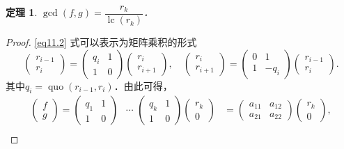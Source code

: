 \documentclass[a4paper,fontset=windows]{ctexbook}
\newtheorem{theorem}{定理}[chapter]
\theoremstyle{definition}
\DeclareMathOperator{\lc}{lc}
\DeclareMathOperator{\quo}{quo}
\begin{document}
\begin{theorem}\label{thm11.6}
$\gcd(f,g)=\dfrac{r_k}{\lc(r_k)}$．
\end{theorem}

\begin{proof}
\eqref{eq11.2} 式可以表示为矩阵乘积的形式
$$\begin{pmatrix}r_{i-1} \\ r_i\end{pmatrix}=\begin{pmatrix}q_i&1 \\ 1&0\end{pmatrix}\begin{pmatrix}r_i \\ r_{i+1}\end{pmatrix},\quad\begin{pmatrix}r_i \\ r_{i+1}\end{pmatrix}=\begin{pmatrix}0&1 \\ 1&-q_i\end{pmatrix}\begin{pmatrix}r_{i-1} \\ r_i\end{pmatrix}.$$
其中$q_i=\quo(r_{i-1},r_i)$．由此可得，
\begin{align}
\begin{pmatrix}f \\ g\end{pmatrix}=\begin{pmatrix}q_1&1 \\ 1&0\end{pmatrix}\hspace{9pt}\cdots\hspace{4pt}\begin{pmatrix}q_k&1 \\ 1&0\end{pmatrix}\begin{pmatrix}r_k \\ 0\end{pmatrix}&=\begin{pmatrix}a_{11}&a_{12} \\ a_{21}&a_{22}\end{pmatrix}\begin{pmatrix}r_k \\ 0\end{pmatrix},\label{eq11.3} \\

\end{align}
\end{proof}
\end{document}
